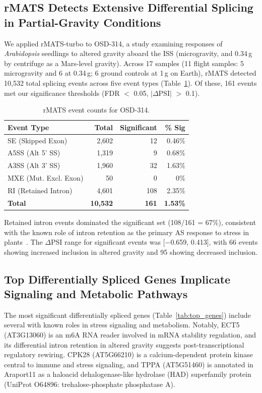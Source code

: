 \documentclass[12pt,a4paper]{article}
\begin{document}
\subsection{rMATS Detects Extensive Differential Splicing in Partial-Gravity Conditions}

We applied rMATS-turbo to OSD-314, a study examining responses of \textit{Arabidopsis} seedlings to altered gravity aboard the ISS (microgravity, and 0.34\,g by centrifuge as a Mars-level gravity). Across 17 samples (11 flight samples: 5 microgravity and 6 at 0.34\,g; 6 ground controls at 1\,g on Earth), rMATS detected 10,532 total splicing events across five event types (Table~\ref{tab:osd314_events}). Of these, 161 events met our significance thresholds (FDR $<$ 0.05, $|\Delta\text{PSI}|$ $>$ 0.1).

\begin{table}[h]
\centering
\caption{rMATS event counts for OSD-314.}
\label{tab:osd314_events}
\begin{tabular}{lrrr}
\toprule
\textbf{Event Type} & \textbf{Total} & \textbf{Significant} & \textbf{\% Sig} \\
\midrule
SE (Skipped Exon) & 2,602 & 12 & 0.46\% \\
A5SS (Alt 5' SS) & 1,319 & 9 & 0.68\% \\
A3SS (Alt 3' SS) & 1,960 & 32 & 1.63\% \\
MXE (Mut. Excl. Exon) & 50 & 0 & 0\% \\
RI (Retained Intron) & 4,601 & 108 & 2.35\% \\
\textbf{Total} & \textbf{10,532} & \textbf{161} & \textbf{1.53\%} \\
\bottomrule
\end{tabular}
\end{table}

Retained intron events dominated the significant set (108/161 = 67\%), consistent with the known role of intron retention as the primary AS response to stress in plants~\cite{kalyna2012}. The $\Delta$PSI range for significant events was [$-$0.659, 0.413], with 66 events showing increased inclusion in altered gravity and 95 showing decreased inclusion.

\subsection{Top Differentially Spliced Genes Implicate Signaling and Metabolic Pathways}

The most significant differentially spliced genes (Table~\ref{tab:top_genes}) include several with known roles in stress signaling and metabolism. Notably, ECT5 (AT3G13060) is an m6A RNA reader involved in mRNA stability regulation, and its differential intron retention in altered gravity suggests post-transcriptional regulatory rewiring. CPK28 (AT5G66210) is a calcium-dependent protein kinase central to immune and stress signaling, and TPPA (AT5G51460) is annotated in Araport11 as a haloacid dehalogenase-like hydrolase (HAD) superfamily protein (UniProt O64896: trehalose-phosphate phosphatase A).
\end{document}
